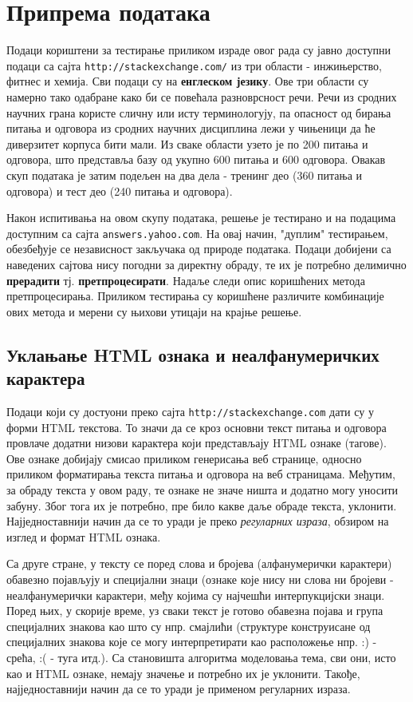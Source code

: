 \chapter{Припрема података}

Подаци  кориштени за тестирање приликом израде овог рада су јавно доступни подаци са сајта \texttt{http://stackexchange.com/} из три области  - инжињерство, фитнес и хемија. Сви подаци су на \textbf{енглеском језику}. Ове три области су намерно тако одабране како би се повећала разноврсност речи. Речи из сродних научних грана користе сличну или исту терминологују, па опасност од бирања питања и одговора из  сродних научних дисциплина лежи у чињеници да ће диверзитет корпуса бити мали. Из сваке области узето је по 200 питања и одговора, што представља базу од укупно 600 питања и 600 одговора. Овакав скуп података је затим подељен на два дела - тренинг део (360 питања и одговора) и тест део (240 питања и одговора).

Након испитивања на овом скупу података, решење је тестирано и на подацима доступним са сајта \texttt{answers.yahoo.com}. На овај начин, "дуплим" тестирањем, обезбеђује се независност закључака од природе података. Подаци добијени са наведених сајтова нису погодни за директну обраду, те их је потребно делимично \textbf{прерадити} тј. \textbf{претпроцесирати}. Надаље следи опис коришћених метода претпроцесирања. Приликом тестирања су коришћене различите комбинације ових метода и мерени су њихови утицаји на крајње решење.


\section{Уклањање HTML ознака и неалфанумеричких карактера}

Подаци који су достуони преко сајта \texttt{http://stackexchange.com} дати су у форми HTML текстова. То значи да се кроз основни текст питања и одговора провлаче додатни низови карактера који представљају HTML ознаке (тагове). Ове ознаке добијају смисао приликом генерисања веб странице, односно приликом форматирања текста питања и одговора на веб страницама. Међутим, за обраду текста у овом раду, те ознаке не значе ништа и додатно могу уносити забуну. Због тога их је потребно, пре било какве даље обраде текста, уклонити. Најједноставнији начин да се то уради је преко \textit{регуларних израза}, обзиром на изглед и формат HTML ознака.

Са друге стране, у тексту се поред слова и бројева (алфанумерички карактери) обавезно појављују и специјални знаци (ознаке које нису ни слова ни бројеви - неалфанумерички карактери, међу којима су најчешћи интерпукцијски знаци. Поред њих, у скорије време, уз сваки текст је готово обавезна појава и група специјалних знакова као што су нпр. смајлићи (структуре конструисане од специјалних знакова које се могу интерпретирати као расположење нпр. :) - срећа, :( - туга  итд.). Са становишта алгоритма моделовања тема, сви они, исто као и HTML ознаке, немају значење и потребно их је уклонити. Такође, најједноставнији начин да се то уради је применом регуларних израза.

